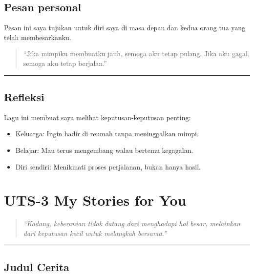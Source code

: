 \documentclass[
  letterpaper,
  DIV=11,
  numbers=noendperiod]{scrreprt}
\providecommand{\tightlist}{%
  \setlength{\itemsep}{0pt}\setlength{\parskip}{0pt}}
\begin{document}
\section{Pesan personal}\label{pesan-personal}

Pesan ini saya tujukan untuk diri saya di masa depan dan kedua orang tua
yang telah membesarkanku.

\begin{quote}
``Jika mimpiku membuatku jauh, semoga aku tetap pulang. Jika aku gagal,
semoga aku tetap berjalan.''
\end{quote}

\begin{center}\rule{0.5\linewidth}{0.5pt}\end{center}

\section{Refleksi}\label{refleksi}

Lagu ini membuat saya melihat keputusan-keputusan penting:

\begin{itemize}
\tightlist
\item
  Keluarga: Ingin hadir di reumah tanpa meninggalkan mimpi.
\item
  Belajar: Mau terus mengembang walau bertemu kegagalan.
\item
  Diri sendiri: Menikmati proses perjalanan, bukan hanya hasil.
\end{itemize}


\chapter{UTS-3 My Stories for You}\label{uts-3-my-stories-for-you}

\begin{quote}
\emph{``Kadang, keberanian tidak datang dari menghadapi hal besar,
melainkan dari keputusan kecil untuk melangkah bersama.''}
\end{quote}

\begin{center}\rule{0.5\linewidth}{0.5pt}\end{center}

\section{Judul Cerita}\label{judul-cerita}
\end{document}
